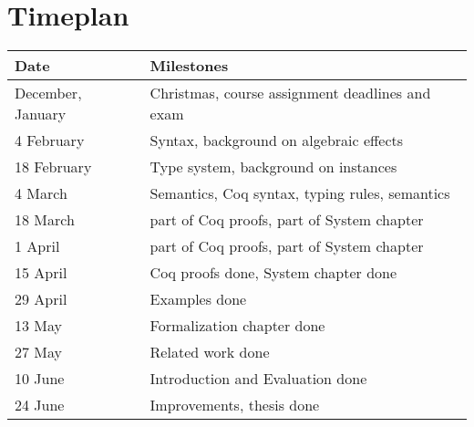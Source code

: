 \documentclass[12pt]{article}
\begin{document}
\section{Timeplan}
\begin{tabular}{ l | l }
\textbf{Date}             & \textbf{Milestones}                      \\ \hline
December, January & Christmas, course assignment deadlines and exam \\ \hline
4 February & Syntax, background on algebraic effects      \\ \hline
18 February & Type system, background on instances \\ \hline
4 March & Semantics, Coq syntax, typing rules, semantics      \\ \hline
18 March & part of Coq proofs, part of System chapter  \\ \hline
1 April & part of Coq proofs, part of System chapter  \\ \hline
15 April & Coq proofs done, System chapter done      \\ \hline
29 April & Examples done      \\ \hline
13 May & Formalization chapter done      \\ \hline
27 May & Related work done     \\ \hline
10 June & Introduction and Evaluation done      \\ \hline
24 June & Improvements, thesis done      \\ \hline
\end{tabular}
\end{document}
